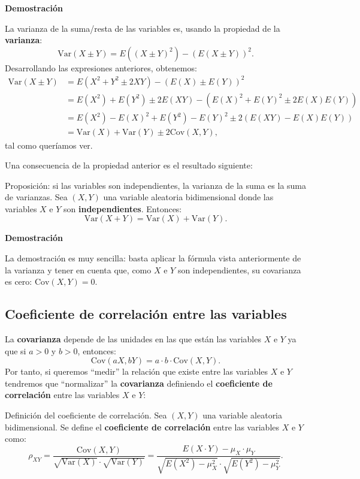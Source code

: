 \documentclass[]{book}
\begin{document}
\textbf{Demostración}

La varianza de la suma/resta de las variables es, usando la propiedad de la \textbf{varianza}:
\[
\mathrm{Var}(X\pm Y)=E\left((X\pm Y)^2\right)-\left(E(X\pm Y)\right)^2.
\]
Desarrollando las expresiones anteriores, obtenemos:
\[
\begin{array}{rl}
\mathrm{Var}(X\pm Y) & =E\left(X^2+Y^2\pm 2XY\right)-\left(E(X)\pm E(Y)\right)^2 \\ & =E(X^2)+E(Y^2)\pm 2E(XY)-\left(E(X)^2+E(Y)^2\pm 2E(X)E(Y)\right) 
\\ & = E(X^2)-E(X)^2+E(Y^2)-E(Y)^2\pm 2(E(XY)-E(X)E(Y)) \\ & = \mathrm{Var}(X)+\mathrm{Var}(Y)\pm 2\mathrm{Cov}(X,Y),
\end{array}
\]
tal como queríamos ver.

Una consecuencia de la propiedad anterior es el resultado siguiente:

Proposición: si las variables son independientes, la varianza de la suma es la suma de varianzas.
Sea \((X,Y)\) una variable aleatoria bidimensional donde las variables \(X\) e \(Y\) son \textbf{independientes}.
Entonces:
\[
\mathrm{Var}(X+Y)=\mathrm{Var}(X)+\mathrm{Var}(Y).
\]

\textbf{Demostración}

La demostración es muy sencilla: basta aplicar la fórmula vista anteriormente de la varianza y tener en cuenta que, como \(X\) e \(Y\) son independientes, su covarianza es cero: \(\mathrm{Cov}(X,Y)=0\).

\hypertarget{coeficiente-de-correlaciuxf3n-entre-las-variables}{%
\subsection{Coeficiente de correlación entre las variables}\label{coeficiente-de-correlaciuxf3n-entre-las-variables}}

La \textbf{covarianza} depende de las unidades en las que están las variables \(X\) e \(Y\) ya que si \(a>0\) y \(b>0\), entonces:
\[
\mathrm{Cov}(aX,bY)=a\cdot b\cdot \mathrm{Cov}(X,Y).
\]
Por tanto, si queremos ``medir'' la relación que existe entre las variables \(X\) e \(Y\) tendremos que ``normalizar'' la \textbf{covarianza} definiendo el \textbf{coeficiente de correlación} entre las variables \(X\) e \(Y\):

Definición del coeficiente de correlación.
Sea \((X,Y)\) una variable aleatoria bidimensional. Se define el \textbf{coeficiente de correlación} entre las variables \(X\) e \(Y\) como:
\[
\rho_{XY}=\frac{\mathrm{Cov}(X,Y)}{\sqrt{\mathrm{Var}(X)}\cdot\sqrt{\mathrm{Var}(Y)}}=\frac{E(X\cdot Y)-\mu_X\cdot \mu_Y}{\sqrt{E\left(X^2\right)-\mu_X^2}\cdot \sqrt{E\left(Y^2\right)-\mu_Y^2}}.
\]
\end{document}
